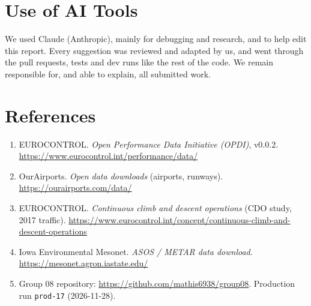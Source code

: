 \documentclass[11pt,a4paper]{article}
\begin{document}
\section{Use of AI Tools}
We used Claude (Anthropic), mainly for debugging and research, and to help edit this report. Every suggestion was reviewed and adapted by us, and went through the pull requests, tests and dev runs like the rest of the code. We remain responsible for, and able to explain, all submitted work.

\section*{References}
\begin{footnotesize}
\begin{enumerate}[nosep,leftmargin=*]
    \item EUROCONTROL. \textit{Open Performance Data Initiative (OPDI)}, v0.0.2. \url{https://www.eurocontrol.int/performance/data/}
    \item OurAirports. \textit{Open data downloads} (airports, runways). \url{https://ourairports.com/data/}
    \item EUROCONTROL. \textit{Continuous climb and descent operations} (CDO study, 2017 traffic). \url{https://www.eurocontrol.int/concept/continuous-climb-and-descent-operations}
    \item Iowa Environmental Mesonet. \textit{ASOS / METAR data download}. \url{https://mesonet.agron.iastate.edu/}
    \item Group 08 repository: \url{https://github.com/mathis6938/group08}. Production run \texttt{prod-17} (2026-11-28).
\end{enumerate}
\end{footnotesize}
\end{document}
